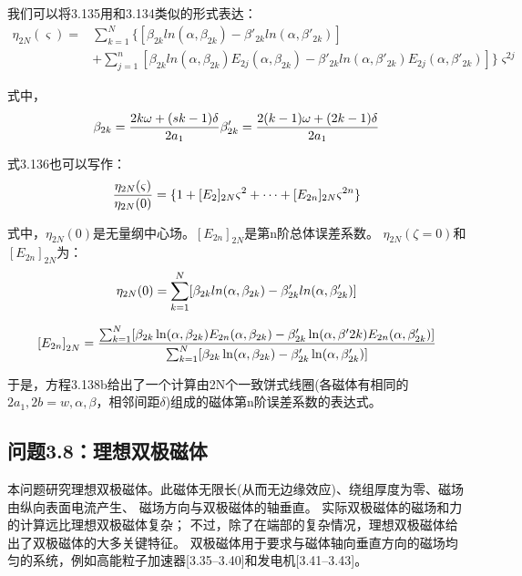 我们可以将3.135用和3.134类似的形式表达：
\begin{equation}
\begin{split}
\eta_{2N}(\varsigma)=&\sum_{k=1}^{N}\{\left[\beta_{2k}ln(\alpha,\beta_{2k})-\beta'_{2k}ln(\alpha,\beta'_{2k})\right]\\
&+\sum_{j=1}^{n}[\beta_{2k}ln(\alpha,\beta_{2k})E_{2j}(\alpha,\beta_{2k})-\beta'_{2k}ln(\alpha,\beta'_{2k})E_{2j}(\alpha,\beta'_{2k})]\}\varsigma^{2j}%
\end{split}
\end{equation}

式中，
\begin{equation}
\beta_{2k}=\frac{2k\omega+(sk-1)\delta}{2a_1}\\ \beta'_{2k}=\frac{2(k-1)\omega+(2k-1)\delta}{2a_{1}}\\
\end{equation}

式3.136也可以写作：
\begin{equation}
\frac{\eta_{2N}(\varsigma)}{\eta_{2N}(0)}=\{1+[E_{2}]_{2N}\varsigma^2+\cdots+[E_{2n}]_{2N}\varsigma^{2n}\}\\%
\end{equation}

式中，$\eta_{2N}(0)$是无量纲中心场。$[E_{2n}]_{2N}$是第n阶总体误差系数。
$\eta_{2N}(\zeta=0)$和$[E_{2n}]_{2N}$为：
\begin{equation}
\eta_{2N}(0)=\sum_{k=1}^{N}[\beta_{2k}ln(\alpha,\beta_{2k})-\beta'_{2k}ln(\alpha,\beta'_{2k})]\\%
\end{equation}

\begin{equation}
{[E_{2n}]}_{2N}=\frac{\sum_{k=1}^{N}[\beta_{2k}\ln(\alpha,\beta_{2k})E_{2n}(\alpha,\beta_{2k})-\beta'_{2k}\ln(\alpha,\beta'{2k})E_{2n}(\alpha,\beta'_{2k})]}{\sum_{k=1}^{N}[\beta_{2k}\ln(\alpha,\beta_{2k})-\beta'_{2k}\ln(\alpha,\beta'_{2k})]}\\%
\end{equation}

于是，方程3.138b给出了一个计算由2N个一致饼式线圈(各磁体有相同的$2a_1,2b=w,\alpha,\beta$，相邻间距$\delta$)组成的磁体第n阶误差系数的表达式。
\newpage


\subsection{问题3.8：理想双极磁体}
本问题研究理想双极磁体。此磁体无限长(从而无边缘效应)、绕组厚度为零、磁场由纵向表面电流产生、
磁场方向与双极磁体的轴垂直。
实际双极磁体的磁场和力的计算远比理想双极磁体复杂；
不过，除了在端部的复杂情况，理想双极磁体给出了双极磁体的大多关键特征。
双极磁体用于要求与磁体轴向垂直方向的磁场均匀的系统，例如高能粒子加速器[3.35–3.40]和发电机[3.41–3.43]。

